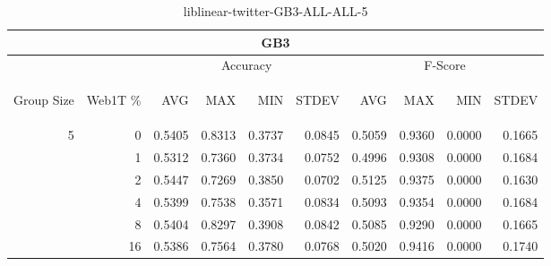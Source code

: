 \begin{center}
\begin{table}[htbp]
\begin{tabular}{ | r | r | r | r | r | r | r | r | r | r |}
\hline
\multicolumn{10}{|c|}{GB3}\\
\hline
 & & \multicolumn{4}{|c|}{Accuracy} & \multicolumn{4}{|c|}{F-Score}\\ \cline{3-10}
\begin{sideways}Group Size\end{sideways} & \begin{sideways}Web1T \%\end{sideways} & \begin{sideways}AVG\end{sideways} & \begin{sideways}MAX\end{sideways} & \begin{sideways}MIN\end{sideways} & \begin{sideways}STDEV\end{sideways} & \begin{sideways}AVG\end{sideways} & \begin{sideways}MAX\end{sideways} & \begin{sideways}MIN\end{sideways} & \begin{sideways}STDEV\end{sideways}\\
\hline
\multirow{5}{*}{5}
 & 0 & 0.5405 & 0.8313 & 0.3737 & 0.0845 & 0.5059 & 0.9360 & 0.0000 & 0.1665\\ \cline{2-10}
 & 1 & 0.5312 & 0.7360 & 0.3734 & 0.0752 & 0.4996 & 0.9308 & 0.0000 & 0.1684\\ \cline{2-10}
 & 2 & 0.5447 & 0.7269 & 0.3850 & 0.0702 & 0.5125 & 0.9375 & 0.0000 & 0.1630\\ \cline{2-10}
 & 4 & 0.5399 & 0.7538 & 0.3571 & 0.0834 & 0.5093 & 0.9354 & 0.0000 & 0.1684\\ \cline{2-10}
 & 8 & 0.5404 & 0.8297 & 0.3908 & 0.0842 & 0.5085 & 0.9290 & 0.0000 & 0.1665\\ \cline{2-10}
 & 16 & 0.5386 & 0.7564 & 0.3780 & 0.0768 & 0.5020 & 0.9416 & 0.0000 & 0.1740\\ \cline{2-10}
\hline
\end{tabular}
\caption{liblinear-twitter-GB3-ALL-ALL-5}
\label{table:liblinear-twitter-GB3-ALL-ALL-5}
\end{table}
\end{center}

